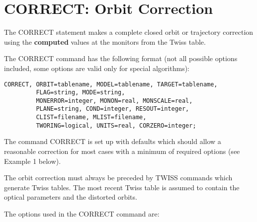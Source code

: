 
\section{CORRECT: Orbit Correction}  
\label{sec:correct}

The CORRECT statement makes a complete closed orbit or trajectory
correction using the \textbf{computed} values at the monitors from the
Twiss table.   

The CORRECT command has the following format (not all possible options
included, some options are valid only for special algorithms):  

\begin{verbatim}
CORRECT, ORBIT=tablename, MODEL=tablename, TARGET=tablename,
         FLAG=string, MODE=string,  
         MONERROR=integer, MONON=real, MONSCALE=real,
         PLANE=string, COND=integer, RESOUT=integer,
         CLIST=filename, MLIST=filename,
         TWORING=logical, UNITS=real, CORZERO=integer;  
\end{verbatim} 

The command CORRECT is set up with defaults which should allow a
reasonable correction for most cases with a minimum of required options
(see Example 1 below).  

The orbit correction must always be preceded by TWISS commands  which
generate Twiss tables. The most recent Twiss table is assumed to contain
the optical parameters and the distorted orbits. 

The options used in the CORRECT command are: 

